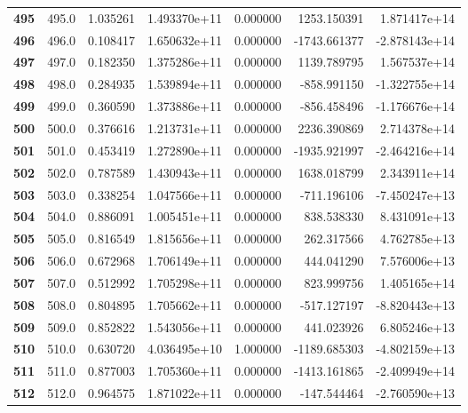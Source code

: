 \documentclass{report}[12pt]
\begin{document}
\begin{center}
\begin{tabular}{lrrrrrr}
\textbf{495 } &          495.0 &   1.035261 &  1.493370e+11 &    0.000000 &  1253.150391 &  1.871417e+14 \\
\textbf{496 } &          496.0 &   0.108417 &  1.650632e+11 &    0.000000 & -1743.661377 & -2.878143e+14 \\
\textbf{497 } &          497.0 &   0.182350 &  1.375286e+11 &    0.000000 &  1139.789795 &  1.567537e+14 \\
\textbf{498 } &          498.0 &   0.284935 &  1.539894e+11 &    0.000000 &  -858.991150 & -1.322755e+14 \\
\textbf{499 } &          499.0 &   0.360590 &  1.373886e+11 &    0.000000 &  -856.458496 & -1.176676e+14 \\
\textbf{500 } &          500.0 &   0.376616 &  1.213731e+11 &    0.000000 &  2236.390869 &  2.714378e+14 \\
\textbf{501 } &          501.0 &   0.453419 &  1.272890e+11 &    0.000000 & -1935.921997 & -2.464216e+14 \\
\textbf{502 } &          502.0 &   0.787589 &  1.430943e+11 &    0.000000 &  1638.018799 &  2.343911e+14 \\
\textbf{503 } &          503.0 &   0.338254 &  1.047566e+11 &    0.000000 &  -711.196106 & -7.450247e+13 \\
\textbf{504 } &          504.0 &   0.886091 &  1.005451e+11 &    0.000000 &   838.538330 &  8.431091e+13 \\
\textbf{505 } &          505.0 &   0.816549 &  1.815656e+11 &    0.000000 &   262.317566 &  4.762785e+13 \\
\textbf{506 } &          506.0 &   0.672968 &  1.706149e+11 &    0.000000 &   444.041290 &  7.576006e+13 \\
\textbf{507 } &          507.0 &   0.512992 &  1.705298e+11 &    0.000000 &   823.999756 &  1.405165e+14 \\
\textbf{508 } &          508.0 &   0.804895 &  1.705662e+11 &    0.000000 &  -517.127197 & -8.820443e+13 \\
\textbf{509 } &          509.0 &   0.852822 &  1.543056e+11 &    0.000000 &   441.023926 &  6.805246e+13 \\
\textbf{510 } &          510.0 &   0.630720 &  4.036495e+10 &    1.000000 & -1189.685303 & -4.802159e+13 \\
\textbf{511 } &          511.0 &   0.877003 &  1.705360e+11 &    0.000000 & -1413.161865 & -2.409949e+14 \\
\textbf{512 } &          512.0 &   0.964575 &  1.871022e+11 &    0.000000 &  -147.544464 & -2.760590e+13 \\

\end{tabular}
\end{center}
\end{document}
